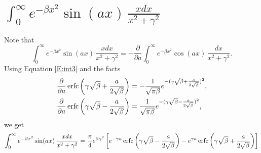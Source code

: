 \section{ $ \int_0^{\infty} e^{-\beta x^2} \sin(a x) \, \frac{x dx}{x^2+\gamma^2} $ }
Note that
\[
  \int_0^{\infty} e^{-\beta x^2} \sin(a x) \, \frac{x dx}{x^2+\gamma^2} 
   = - \frac{\partial}{\partial a} 
       \int_0^{\infty} e^{-\beta x^2} \cos(a x) \, \frac{dx}{x^2+\gamma^2}.
\]
Using Equation \ref{E:int3} and the facts
\begin{align*}
  \frac{\partial}{\partial a} 
    \operatorname*{erfc} \left( \gamma \sqrt{\beta} + \frac{a}{2\sqrt{\beta}} \right)
  &= - \frac{1}{\sqrt{\pi \beta}} 
    e^{-( \gamma \sqrt{\beta} + \frac{a}{2\sqrt{\beta}} )^2 },  \\
  \frac{\partial}{\partial a} 
    \operatorname*{erfc} \left( \gamma \sqrt{\beta} - \frac{a}{2\sqrt{\beta}} \right)
  &= \frac{1}{\sqrt{\pi \beta}} 
    e^{-( \gamma \sqrt{\beta} - \frac{a}{2\sqrt{\beta}} )^2 },  
\end{align*}
we get 
\begin{equation} \label{E:int4}
  \int_0^{\infty} e^{-\beta x^2} \sin(a x) \, \frac{x dx}{x^2+\gamma^2} 
    = \frac{\pi}{4} e^{\beta \gamma^2}
      \left[
        e^{-\gamma a} 
          \operatorname*{erfc} \left( \gamma \sqrt{\beta} - \frac{a}{2\sqrt{\beta}} \right)
        - e^{\gamma a} 
          \operatorname*{erfc} \left( \gamma \sqrt{\beta} + \frac{a}{2\sqrt{\beta}} \right)
      \right]
\end{equation}


